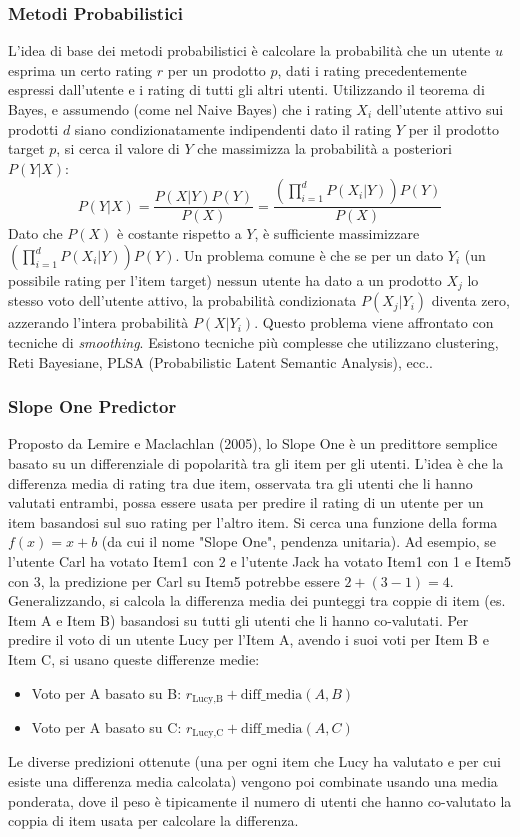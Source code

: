 \documentclass{article}
\begin{document}
\subsubsection{Metodi Probabilistici}
L'idea di base dei metodi probabilistici è calcolare la probabilità che un utente $u$ esprima un certo rating $r$ per un prodotto $p$, dati i rating precedentemente espressi dall'utente e i rating di tutti gli altri utenti.
Utilizzando il teorema di Bayes, e assumendo (come nel Naive Bayes) che i rating $X_i$ dell'utente attivo sui prodotti $d$ siano condizionatamente indipendenti dato il rating $Y$ per il prodotto target $p$, si cerca il valore di $Y$ che massimizza la probabilità a posteriori $P(Y|X)$:
$$ P(Y|X) = \frac{P(X|Y)P(Y)}{P(X)} = \frac{\left(\prod_{i=1}^{d} P(X_i|Y)\right) P(Y)}{P(X)} $$
Dato che $P(X)$ è costante rispetto a $Y$, è sufficiente massimizzare $\left(\prod_{i=1}^{d} P(X_i|Y)\right) P(Y)$.
Un problema comune è che se per un dato $Y_i$ (un possibile rating per l'item target) nessun utente ha dato a un prodotto $X_j$ lo stesso voto dell'utente attivo, la probabilità condizionata $P(X_j|Y_i)$ diventa zero, azzerando l'intera probabilità $P(X|Y_i)$. Questo problema viene affrontato con tecniche di \textit{smoothing}.
Esistono tecniche più complesse che utilizzano clustering, Reti Bayesiane, PLSA (Probabilistic Latent Semantic Analysis), ecc..

\subsubsection{Slope One Predictor}
Proposto da Lemire e Maclachlan (2005), lo Slope One è un predittore semplice basato su un differenziale di popolarità tra gli item per gli utenti. L'idea è che la differenza media di rating tra due item, osservata tra gli utenti che li hanno valutati entrambi, possa essere usata per predire il rating di un utente per un item basandosi sul suo rating per l'altro item. Si cerca una funzione della forma $f(x) = x+b$ (da cui il nome "Slope One", pendenza unitaria).
Ad esempio, se l'utente Carl ha votato Item1 con 2 e l'utente Jack ha votato Item1 con 1 e Item5 con 3, la predizione per Carl su Item5 potrebbe essere $2 + (3-1) = 4$.
Generalizzando, si calcola la differenza media dei punteggi tra coppie di item (es. Item A e Item B) basandosi su tutti gli utenti che li hanno co-valutati. Per predire il voto di un utente Lucy per l'Item A, avendo i suoi voti per Item B e Item C, si usano queste differenze medie:
\begin{itemize}
    \item Voto per A basato su B: $r_{\text{Lucy,B}} + \text{diff\_media}(A,B)$
    \item Voto per A basato su C: $r_{\text{Lucy,C}} + \text{diff\_media}(A,C)$
\end{itemize}
Le diverse predizioni ottenute (una per ogni item che Lucy ha valutato e per cui esiste una differenza media calcolata) vengono poi combinate usando una media ponderata, dove il peso è tipicamente il numero di utenti che hanno co-valutato la coppia di item usata per calcolare la differenza.
\end{document}
